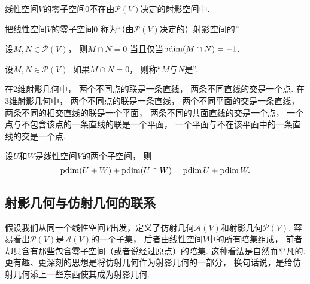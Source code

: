 \begin{property}
线性空间\(V\)的零子空间\(0\)不在由\(\mathcal{P}(V)\)决定的射影空间中.
\end{property}

\begin{definition}
把线性空间\(V\)的零子空间\(0\)
称为“（由\(\mathcal{P}(V)\)决定的）射影空间的”.
\end{definition}

\begin{proposition}
设\(M,N \in \mathcal{P}(V)\)，
则\(M \cap N = 0\)
当且仅当\(\operatorname{pdim}(M \cap N) = -1\).
\end{proposition}

\begin{definition}
设\(M,N \in \mathcal{P}(V)\).
如果\(M \cap N = 0\)，
则称“\(M\)与\(N\)是”.
\end{definition}

在2维射影几何中，
两个不同点的联是一条直线，
两条不同直线的交是一个点.
在3维射影几何中，
两个不同点的联是一条直线，
两个不同平面的交是一条直线，
两条不同的相交直线的联是一个平面，
两条不同的共面直线的交是一个点，
一个点与不包含该点的一条直线的联是一个平面，
一个平面与不在该平面中的一条直线的交是一个点.

\begin{theorem}
设\(U\)和\(W\)是线性空间\(V\)的两个子空间，
则\begin{equation*}
	\operatorname{pdim}(U + W)
	+ \operatorname{pdim} (U \cap W)
	= \operatorname{pdim} U
	+ \operatorname{pdim} W.
\end{equation*}
\end{theorem}

\subsection{射影几何与仿射几何的联系}
假设我们从同一个线性空间\(V\)出发，定义了仿射几何\(\mathcal{A}(V)\)和射影几何\(\mathcal{P}(V)\).
容易看出\(\mathcal{P}(V)\)是\(\mathcal{A}(V)\)的一个子集，
后者由线性空间\(V\)中的所有陪集组成，
前者却只含有那些包含零子空间（或者说经过原点）的陪集.
这种看法是自然而平凡的.
更有趣、更深刻的思想是将仿射几何作为射影几何的一部分，
换句话说，是给仿射几何添上一些东西使其成为射影几何.

